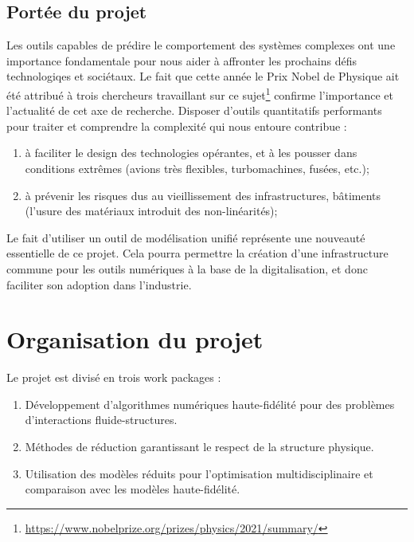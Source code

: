 \documentclass[french]{article}
\begin{document}
\subsection{Portée du projet}

Les outils capables de prédire le comportement des systèmes complexes ont une importance
fondamentale pour nous aider à affronter les prochains défis technologiqes et sociétaux. Le fait que cette année le Prix Nobel de Physique ait été attribué à trois chercheurs travaillant sur ce sujet\footnote{\url{https://www.nobelprize.org/prizes/physics/2021/summary/}} confirme
l’importance et l’actualité de cet axe de recherche. Disposer d'outils quantitatifs performants pour traiter et comprendre la complexité qui nous entoure contribue :

\begin{enumerate}
	\item à faciliter le design des technologies opérantes, et à les pousser dans conditions extrêmes
	(avions très flexibles, turbomachines, fusées, etc.);
	\item à prévenir les risques dus au vieillissement des infrastructures, bâtiments (l’usure
	des matériaux introduit des non-linéarités);
\end{enumerate} 

Le fait d’utiliser un outil de modélisation unifié représente une nouveauté essentielle de ce projet.
Cela pourra permettre la création d’une infrastructure commune pour les outils numériques à la base de la digitalisation,  et donc faciliter son adoption dans l'industrie.


\section{Organisation du projet}
Le projet est divisé en trois work packages :

\begin{enumerate}
	\item Développement d'algorithmes numériques haute-fidélité pour des problèmes d'interactions fluide-structures.
	\item Méthodes de réduction garantissant le respect de la structure physique. 
	\item Utilisation des modèles réduits pour l'optimisation multidisciplinaire et comparaison avec les  modèles haute-fidélité.
\end{enumerate}
\end{document}
